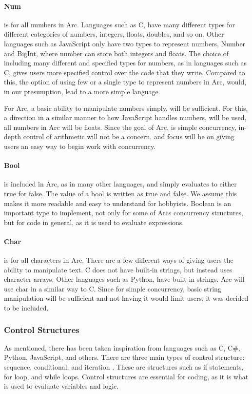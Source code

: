 \paragraph{Num} is for all numbers in Arc. Languages such as C, have many different types for different categories of numbers, integers, floats, doubles, and so on. Other languages such as JavaScript only have two types to represent numbers, Number and BigInt, where number can store both integers and floats.
The choice of including many different and specified types for numbers, as in languages such as C, gives users more specified control over the code that they write.
Compared to this, the option of using few or a single type to represent numbers in Arc, would, in our presumption, lead to a more simple language.

For Arc, a basic ability to manipulate numbers simply, will be sufficient. For this, a direction in a similar manner to how JavaScript handles numbers, will be used, all numbers in Arc will be floats. Since the goal of Arc, is simple concurrency, in-depth control of arithmetic will not be a concern, and focus will be on giving users an easy way to begin work with concurrency.

\paragraph{Bool} is included in Arc, as in many other languages, and simply evaluates to either true for false. The value of a bool is written as true and false. We assume this makes it more readable and easy to understand for hobbyists. Boolean is an important type to implement, not only for some of Arcs concurrency structures, but for code in general, as it is used to evaluate expressions. 

\paragraph{Char} is for all characters in Arc. There are a few different ways of giving users the ability to manipulate text. C does not have built-in strings, but instead uses character arrays. Other languages such as Python, have built-in strings. Arc will use char in a similar way to C. Since for simple concurrency, basic string manipulation will be sufficient and not having it would limit users, it was decided to be included.


\subsubsection{Control Structures}
As mentioned, there has been taken inspiration from languages such as C, C\#, Python, JavaScript, and others. There are three main types of control structure: sequence, conditional, and iteration \cite*{CBook}. These are structures such as if statements, for loop, and while loops. Control structures are essential for coding, as it is what is used to evaluate variables and logic.

